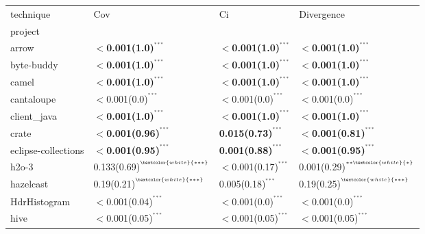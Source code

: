 \begin{tabular}{llll}
\toprule
technique &                                                           Cov &                                                   Ci &                                           Divergence \\
project             &                                                               &                                                      &                                                      \\
\midrule
arrow               &  \textbf{$<$0.001(1.0)}\tiny{$^{^{***}}$} &  \textbf{$<$0.001(1.0)}\tiny{$^{^{***}}$} &  \textbf{$<$0.001(1.0)}\tiny{$^{^{***}}$} \\
byte-buddy          &  \textbf{$<$0.001(1.0)}\tiny{$^{^{***}}$} &  \textbf{$<$0.001(1.0)}\tiny{$^{^{***}}$} &  \textbf{$<$0.001(1.0)}\tiny{$^{^{***}}$} \\
camel               &  \textbf{$<$0.001(1.0)}\tiny{$^{^{***}}$} &  \textbf{$<$0.001(1.0)}\tiny{$^{^{***}}$} &  \textbf{$<$0.001(1.0)}\tiny{$^{^{***}}$} \\
cantaloupe          &  $<$0.001(0.0)\tiny{$^{^{***}}$} &  $<$0.001(0.0)\tiny{$^{^{***}}$} &  $<$0.001(0.0)\tiny{$^{^{***}}$} \\
client_java         &  \textbf{$<$0.001(1.0)}\tiny{$^{^{***}}$} &  \textbf{$<$0.001(1.0)}\tiny{$^{^{***}}$} &  \textbf{$<$0.001(1.0)}\tiny{$^{^{***}}$} \\
crate               &  \textbf{$<$0.001(0.96)}\tiny{$^{^{***}}$} &  \textbf{0.015(0.73)}\tiny{$^{^{***}}$} &  \textbf{$<$0.001(0.81)}\tiny{$^{^{***}}$} \\
eclipse-collections &  \textbf{$<$0.001(0.95)}\tiny{$^{^{***}}$} &  \textbf{0.001(0.88)}\tiny{$^{^{***}}$} &  \textbf{$<$0.001(0.95)}\tiny{$^{^{***}}$} \\
h2o-3               &  0.133(0.69)\tiny{$^{^{\textcolor{white}{***}}}$} &  $<$0.001(0.17)\tiny{$^{^{***}}$} &  0.001(0.29)\tiny{$^{^{**\textcolor{white}{*}}}$} \\
hazelcast           &  0.19(0.21)\tiny{$^{^{\textcolor{white}{***}}}$} &  0.005(0.18)\tiny{$^{^{***}}$} &  0.19(0.25)\tiny{$^{^{\textcolor{white}{***}}}$} \\
HdrHistogram        &  $<$0.001(0.04)\tiny{$^{^{***}}$} &  $<$0.001(0.0)\tiny{$^{^{***}}$} &  $<$0.001(0.0)\tiny{$^{^{***}}$} \\
hive                &  $<$0.001(0.05)\tiny{$^{^{***}}$} &  $<$0.001(0.05)\tiny{$^{^{***}}$} &  $<$0.001(0.05)\tiny{$^{^{***}}$} \\

\end{tabular}
